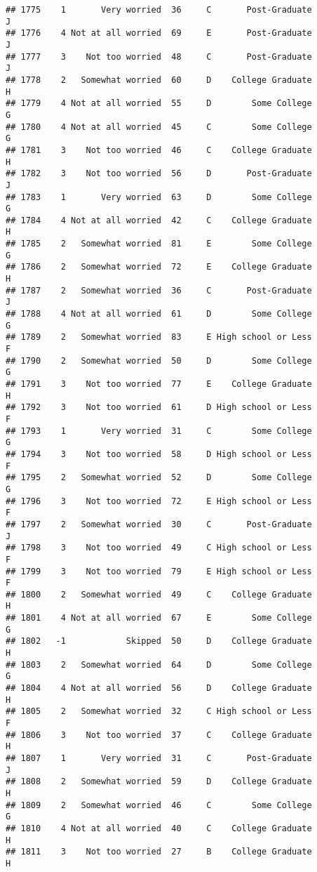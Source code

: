 \documentclass[
]{article}
\begin{document}
\begin{verbatim}
## 1775    1       Very worried  36     C       Post-Graduate         J
## 1776    4 Not at all worried  69     E       Post-Graduate         J
## 1777    3    Not too worried  48     C       Post-Graduate         J
## 1778    2   Somewhat worried  60     D    College Graduate         H
## 1779    4 Not at all worried  55     D        Some College         G
## 1780    4 Not at all worried  45     C        Some College         G
## 1781    3    Not too worried  46     C    College Graduate         H
## 1782    3    Not too worried  56     D       Post-Graduate         J
## 1783    1       Very worried  63     D        Some College         G
## 1784    4 Not at all worried  42     C    College Graduate         H
## 1785    2   Somewhat worried  81     E        Some College         G
## 1786    2   Somewhat worried  72     E    College Graduate         H
## 1787    2   Somewhat worried  36     C       Post-Graduate         J
## 1788    4 Not at all worried  61     D        Some College         G
## 1789    2   Somewhat worried  83     E High school or Less         F
## 1790    2   Somewhat worried  50     D        Some College         G
## 1791    3    Not too worried  77     E    College Graduate         H
## 1792    3    Not too worried  61     D High school or Less         F
## 1793    1       Very worried  31     C        Some College         G
## 1794    3    Not too worried  58     D High school or Less         F
## 1795    2   Somewhat worried  52     D        Some College         G
## 1796    3    Not too worried  72     E High school or Less         F
## 1797    2   Somewhat worried  30     C       Post-Graduate         J
## 1798    3    Not too worried  49     C High school or Less         F
## 1799    3    Not too worried  79     E High school or Less         F
## 1800    2   Somewhat worried  49     C    College Graduate         H
## 1801    4 Not at all worried  67     E        Some College         G
## 1802   -1            Skipped  50     D    College Graduate         H
## 1803    2   Somewhat worried  64     D        Some College         G
## 1804    4 Not at all worried  56     D    College Graduate         H
## 1805    2   Somewhat worried  32     C High school or Less         F
## 1806    3    Not too worried  37     C    College Graduate         H
## 1807    1       Very worried  31     C       Post-Graduate         J
## 1808    2   Somewhat worried  59     D    College Graduate         H
## 1809    2   Somewhat worried  46     C        Some College         G
## 1810    4 Not at all worried  40     C    College Graduate         H
## 1811    3    Not too worried  27     B    College Graduate         H

\end{verbatim}
\end{document}
